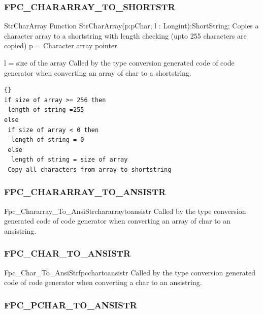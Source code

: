 \documentclass [12pt]{article}
\begin{document}
\subsubsection{FPC{\_}CHARARRAY{\_}TO{\_}SHORTSTR}
\label{subsubsec:mylabel47}

\begin{function}{StrCharArray}
\Declaration
Function StrCharArray(p:pChar; l : Longint):ShortString;
\Description 
Copies a character array to a shortstring with length checking (upto 255
characters are copied)
\Parameters 
p = Character array pointer \par 
l = size of the array 
\Notes 
Called by the type conversion generated code of code generator when
converting an array of char to a shortstring.
\Algorithm
\begin{lstlisting}{}
if size of array >= 256 then  
 length of string =255
else 
 if size of array < 0 then 
  length of string = 0 
 else
  length of string = size of array
 Copy all characters from array to shortstring
\end{lstlisting}
\end{function}

\subsubsection{FPC{\_}CHARARRAY{\_}TO{\_}ANSISTR}
\label{subsubsec:mylabel48}

\begin{functionl}{Fpc{\_}Chararray{\_}To{\_}AnsiStr}{chararraytoansistr}
\Notes 
Called by the type conversion generated code of code generator when converting an array of char to an ansistring. 
\end{functionl}

\subsubsection{FPC{\_}CHAR{\_}TO{\_}ANSISTR}
\label{subsubsec:mylabel49}

\begin{functionl}{Fpc{\_}Char{\_}To{\_}AnsiStr}{fpcchartoansistr}
\Notes 
Called by the type conversion generated code of code generator when
converting a char to an ansistring.
\end{functionl}

\subsubsection{FPC{\_}PCHAR{\_}TO{\_}ANSISTR}
\label{subsubsec:mylabel50}
\end{document}
